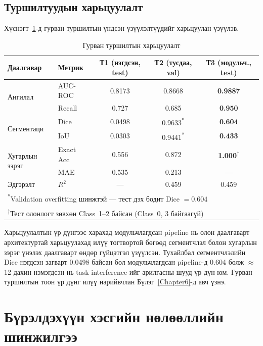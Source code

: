 \subsection{Туршилтуудын харьцуулалт}

Хүснэгт~\ref{tab:exp_compare}-д гурван туршилтын үндсэн үзүүлэлтүүдийг харьцуулан үзүүлэв.

\begin{table}[!htbp]
\centering
\small
\begin{tabular}{l l c c c}
\toprule
\textbf{Даалгавар} & \textbf{Метрик}
  & \textbf{Т1 (нэгдсэн, test)}
  & \textbf{Т2 (тусдаа, val)}
  & \textbf{Т3 (модульч., test)} \\
\midrule
\multirow{2}{*}{Ангилал}
  & AUC-ROC & 0.8173 & 0.8668 & \textbf{0.9887} \\
  & Recall  & 0.727  & 0.685  & \textbf{0.950} \\[4pt]
\multirow{2}{*}{Сегментаци}
  & Dice & 0.0498 & 0.9633\textsuperscript{*} & \textbf{0.604} \\
  & IoU  & 0.0303 & 0.9441\textsuperscript{*} & \textbf{0.433} \\[4pt]
\multirow{2}{*}{Хугарлын зэрэг}
  & Exact Acc & 0.556 & 0.872 & \textbf{1.000}\textsuperscript{†} \\
  & MAE       & 0.535 & 0.213 & \textbf{---} \\[4pt]
Эдгэрэлт & $R^2$ & --- & 0.459 & 0.459 \\
\bottomrule
\multicolumn{5}{l}{\footnotesize\textsuperscript{*}Validation overfitting шинжтэй --- тест дэх бодит Dice $=0.604$} \\
\multicolumn{5}{l}{\footnotesize\textsuperscript{†}Тест олонлогт зөвхөн Class~1--2 байсан (Class~0, 3 байгаагүй)}
\end{tabular}
\caption{Гурван туршилтын харьцуулалт}
\label{tab:exp_compare}
\end{table}

Харьцуулалтын үр дүнгээс харахад модульчлагдсан pipeline нь олон даалгаварт архитектуртай харьцуулахад илүү тогтвортой бөгөөд сегментчлэл болон хугарлын зэрэг үнэлэх даалгаварт өндөр гүйцэтгэл үзүүлсэн. Тухайлбал сегментчлэлийн Dice нэгдсэн загварт 0.0498 байсан бол модульчлагдсан pipeline-д 0.604 болж $\approx$12 дахин нэмэгдсэн нь task interference-ийг арилгасны шууд үр дүн юм. Гурван туршилтын тоон үр дүнг илүү нарийвчлан Бүлэг~\ref{Chapter6}-д авч үзнэ.

\section{Бүрэлдэхүүн хэсгийн нөлөөллийн шинжилгээ}

